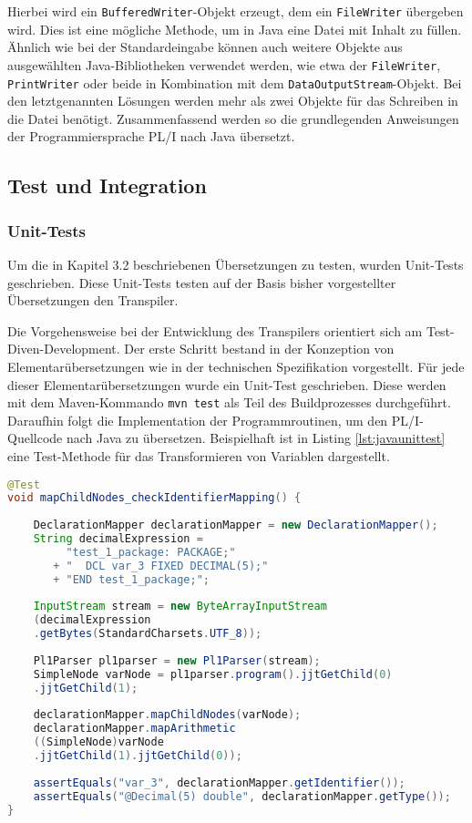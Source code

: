 Hierbei wird ein \verb+BufferedWriter+-Objekt erzeugt, dem ein \verb+FileWriter+ übergeben wird. Dies ist eine mögliche Methode, um in Java eine Datei mit Inhalt zu füllen. Ähnlich wie bei der Standardeingabe können auch weitere Objekte aus ausgewählten Java-Bibliotheken verwendet werden, wie etwa der \verb+FileWriter+, \verb+PrintWriter+ oder beide in Kombination mit dem \verb+DataOutputStream+-Objekt. Bei den letztgenannten Lösungen werden mehr als zwei Objekte für das Schreiben in die Datei benötigt.
Zusammenfassend werden so die grundlegenden Anweisungen der Programmiersprache PL/I nach Java übersetzt. 

\pagebreak
\subsection{Test und Integration}
\subsubsection{Unit-Tests}

Um die in Kapitel 3.2 beschriebenen Übersetzungen zu testen, wurden Unit-Tests geschrieben. 
Diese Unit-Tests testen auf der Basis bisher vorgestellter Übersetzungen den Transpiler.

Die Vorgehensweise bei der Entwicklung des Transpilers orientiert sich am Test-Diven-Development. 
Der erste Schritt bestand in der Konzeption von Elementarübersetzungen wie in der technischen Spezifikation vorgestellt.
Für jede dieser Elementarübersetzungen wurde ein Unit-Test geschrieben. Diese werden mit dem Maven-Kommando \verb+mvn test+ als Teil des Buildprozesses durchgeführt. Daraufhin folgt die Implementation der Programmroutinen, um den PL/I-Quellcode nach Java zu übersetzen.
Beispielhaft ist in Listing \ref{lst:javaunittest} eine Test-Methode für das Transformieren von Variablen dargestellt.

\begin{lstlisting}[language=Java, caption=Arithmetic Node Unit-test, label={lst:javaunittest}]
@Test
void mapChildNodes_checkIdentifierMapping() {
	
	DeclarationMapper declarationMapper = new DeclarationMapper();
	String decimalExpression = 
		 "test_1_package: PACKAGE;" 
	   + "	DCL var_3 FIXED DECIMAL(5);" 
	   + "END test_1_package;";
	
	InputStream stream = new ByteArrayInputStream
	(decimalExpression
	.getBytes(StandardCharsets.UTF_8));
	
	Pl1Parser pl1parser = new Pl1Parser(stream);
	SimpleNode varNode = pl1parser.program().jjtGetChild(0)
	.jjtGetChild(1);
		
	declarationMapper.mapChildNodes(varNode);
	declarationMapper.mapArithmetic
	((SimpleNode)varNode
	.jjtGetChild(1).jjtGetChild(0));
		
	assertEquals("var_3", declarationMapper.getIdentifier());
	assertEquals("@Decimal(5) double", declarationMapper.getType());
}
\end{lstlisting} 

